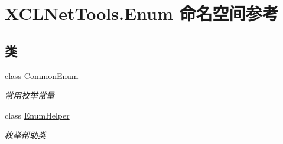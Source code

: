 \hypertarget{namespace_x_c_l_net_tools_1_1_enum}{}\section{X\+C\+L\+Net\+Tools.\+Enum 命名空间参考}
\label{namespace_x_c_l_net_tools_1_1_enum}
\subsection*{类}
\begin{DoxyCompactItemize}
\item 
class \hyperlink{class_x_c_l_net_tools_1_1_enum_1_1_common_enum}{Common\+Enum}
\begin{DoxyCompactList}\small\item\em 常用枚举常量 \end{DoxyCompactList}\item 
class \hyperlink{class_x_c_l_net_tools_1_1_enum_1_1_enum_helper}{Enum\+Helper}
\begin{DoxyCompactList}\small\item\em 枚举帮助类 \end{DoxyCompactList}\end{DoxyCompactItemize}
